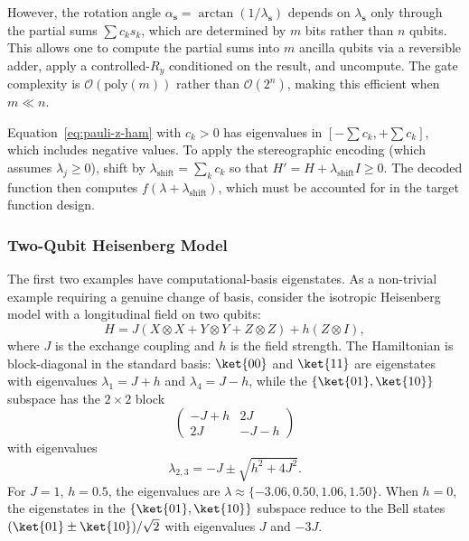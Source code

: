 However, the rotation angle
$\alpha_\mathbf{s} = \arctan(1/\lambda_\mathbf{s})$ depends on
$\lambda_\mathbf{s}$ only through the partial sums
$\sum c_k s_k$, which are determined by $m$ bits rather than
$n$ qubits.  This allows one to compute the partial sums into
$m$ ancilla qubits via a reversible adder, apply a
controlled-$R_y$ conditioned on the result, and uncompute.  The
gate complexity is $\mathcal{O}(\mathrm{poly}(m))$ rather than
$\mathcal{O}(2^n)$, making this efficient when $m \ll n$.

\begin{remark}[Positivity]
	Equation~\eqref{eq:pauli-z-ham} with $c_k > 0$ has eigenvalues in $[-\sum c_k, +\sum c_k]$, which includes negative values. To apply the stereographic encoding (which assumes $\lambda_j \geq 0$), shift by $\lambda_{\mathrm{shift}} = \sum_k c_k$ so that $H' = H + \lambda_{\mathrm{shift}} I \geq 0$. The decoded function then computes $f(\lambda + \lambda_{\mathrm{shift}})$, which must be accounted for in the target function design.
\end{remark}

\subsubsection{Two-Qubit Heisenberg Model}
\label{subsubsec:heisenberg}

The first two examples have computational-basis eigenstates. As a
non-trivial example requiring a genuine change of basis, consider
the isotropic Heisenberg model with a longitudinal field on two
qubits:
\begin{equation}
	H = J(X \otimes X + Y \otimes Y + Z \otimes Z) + h(Z \otimes I),
	\label{eq:heisenberg}
\end{equation}
where $J$ is the exchange coupling and $h$ is the field strength.
The Hamiltonian is block-diagonal in the standard basis:
$\ket{00}$ and $\ket{11}$ are eigenstates with eigenvalues
$\lambda_1 = J + h$ and $\lambda_4 = J - h$, while the
$\{\ket{01}, \ket{10}\}$ subspace has the $2\times 2$ block
\begin{equation}
	\begin{pmatrix} -J+h & 2J \\ 2J & -J-h \end{pmatrix}
\end{equation}
with eigenvalues
\begin{equation}
	\lambda_{2,3} = -J \pm \sqrt{h^2 + 4J^2}.
	\label{eq:heisenberg-spectrum}
\end{equation}
For $J = 1$, $h = 0.5$, the eigenvalues are
$\lambda \approx \{-3.06, 0.50, 1.06, 1.50\}$.  When $h = 0$,
the eigenstates in the $\{\ket{01},\ket{10}\}$ subspace reduce
to the Bell states $(\ket{01}\pm\ket{10})/\sqrt{2}$ with
eigenvalues $J$ and $-3J$.

